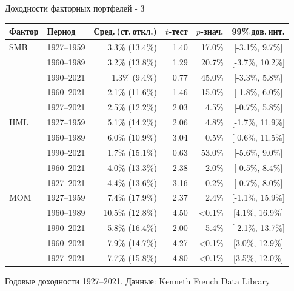 \documentclass{beamer}
\begin{document}
\begin{frame}{Доходности факторных портфелей - 3}
\centering
\scriptsize
\begin{tabular}{l|l|r|r|r|c}
Фактор & Период & Сред.\,(ст.\,откл.) & $t$-тест & $p$-знач. & 99\%\,дов.\,инт.\\ \hline
SMB & 1927--1959 & 3.3\% (13.4\%) & 1.40 & 17.0\% & [-3.1\%,  9.7\%] \\    
    & 1960--1989 & 3.2\% (13.8\%) & 1.29 & 20.7\% & [-3.7\%, 10.2\%] \\ 
    & 1990--2021 & 1.3\%  (9.4\%) & 0.77 & 45.0\% & [-3.3\%,  5.8\%] \\ 
    & 1960--2021 & 2.1\% (11.6\%) & 1.46 & 15.0\% & [-1.8\%,  6.0\%] \\
    & 1927--2021 & 2.5\% (12.2\%) & 2.03 &  4.5\% & [-0.7\%,  5.8\%] \\
\hline
HML & 1927--1959 & 5.1\% (14.2\%) & 2.06 &  4.8\% & [-1.7\%, 11.9\%] \\   
    & 1960--1989 & 6.0\% (10.9\%) & 3.04 &  0.5\% & [ 0.6\%, 11.5\%] \\  
    & 1990--2021 & 1.7\% (15.1\%) & 0.63 & 53.0\% & [-5.6\%,  9.0\%] \\ 
    & 1960--2021 & 4.0\% (13.3\%) & 2.38 &  2.0\% & [-0.5\%,  8.4\%] \\  
    & 1927--2021 & 4.4\% (13.6\%) & 3.16 &  0.2\% & [ 0.7\%,  8.0\%] \\   
\hline
MOM & 1927--1959 &  7.4\% (17.9\%) & 2.37 &  2.4\% & [-1.1\%, 15.9\%] \\    
    & 1960--1989 & 10.5\% (12.8\%) & 4.50 & <0.1\% & [4.1\%, 16.9\%] \\
    & 1990--2021 &  5.8\% (16.4\%) & 2.00 &  5.4\% & [-2.1\%, 13.7\%] \\ 
    & 1960--2021 &  7.9\% (14.7\%) & 4.27 & <0.1\% & [3.0\%, 12.9\%] \\ 
    & 1927--2021 &  7.7\% (15.8\%) & 4.80 & <0.1\% & [3.5\%, 12.0\%] \\
\hline
\end{tabular}

{\scriptsize Годовые доходности 1927--2021. Данные: Kenneth French Data Library}
\end{frame}



\renewcommand{\addFactorPlot}[3]{
        \addplot[
            color=#2,
            mark=#3,
            line width=1pt,
            mark repeat=120,
            mark phase=36,
            mark options={scale=2}
        ]
        table [
            x = date,
            y = #1,
            col sep=comma
        ]
        {data/fama_french_international_cumulative_growth_data.csv};
    }
\end{document}
